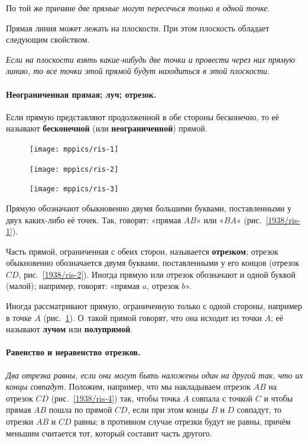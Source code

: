 \documentclass[twoside]{book}
\makeatletter
\newcommand{\rindex}[2][\imki@jobname]{%
  \index[#1]{\detokenize{#2}}%
}
\makeatother
\begin{document}
По той же причине \textit{две прямые могут пересечься только в одной точке}.

Прямая линия может лежать на плоскости.
При этом плоскость обладает следующим свойством.

\textit{Если на плоскости взять какие-нибудь две точки и провести через них прямую линию, то все точки этой прямой будут находиться в этой плоскости.}

\paragraph{Неограниченная прямая; луч; отрезок.}\label{1938/5}
Если прямую представляют продолженной в обе стороны бесконечно, то её называют \textbf{бесконечной} (или \textbf{неограниченной}) прямой.

\begin{figure}
\centering
\texttt{[image: mppics/ris-1]}
\caption{}\label{1938/ris-1}
\bigskip
\texttt{[image: mppics/ris-2]}
\caption{}\label{1938/ris-2}
\bigskip
\texttt{[image: mppics/ris-3]}
\caption{}\label{1938/ris-3}
\end{figure}

Прямую обозначают обыкновенно двумя большими буквами, поставленными у двух каких-либо её точек.
Так, говорят:
«прямая $AB$» или «$BA$» (рис.~\ref{1938/ris-1}).

Часть прямой, ограниченная с обеих сторон, называется \rindex{отрезок}\textbf{отрезком};
отрезок обыкновенно обозначается двумя буквами, поставленными у его концов (отрезок $CD$, рис.~\ref{1938/ris-2}).
Иногда прямую или отрезок обозначают и одной буквой (малой);
например, говорят: «прямая $a$, отрезок $b$».

Иногда рассматривают прямую, ограниченную только с одной стороны, например в точке $A$ (рис.~\ref{1938/ris-3}).
О~такой прямой говорят, что она исходит из точки $A$;
её называют \rindex{луч}\textbf{лучом} или \rindex{полупрямая}\textbf{полупрямой}. %

\paragraph{Равенство и неравенство отрезков.}\label{1938/6}
\emph{Два отрезка равны, если они могут быть наложены один на другой так, что их концы совпадут.}
Положим, например, что мы накладываем отрезок $AB$ на
отрезок $CD$ (рис.~\ref{1938/ris-4}) так, чтобы точка $A$ совпала с точкой $C$ и чтобы прямая $AB$ пошла по прямой $CD$, если при этом концы $B$ и $D$ совпадут, то отрезки $AB$ и $CD$ равны;
в противном случае отрезки будут не равны, причём меньшим считается тот, который составит часть другого.
\end{document}
